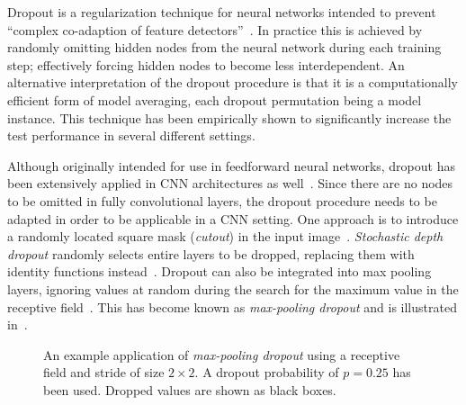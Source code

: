 Dropout is a regularization technique for neural networks intended to prevent \enquote{complex co-adaption of feature detectors}~\cite{dropout-original-paper}.
In practice this is achieved by randomly omitting hidden nodes from the neural network during each training step; effectively forcing hidden nodes to become less interdependent.
An alternative interpretation of the dropout procedure is that it is a computationally efficient form of model averaging, each dropout permutation being a model instance.
This technique has been empirically shown to significantly increase the test performance in several different settings.

Although originally intended for use in feedforward neural networks, dropout has been extensively applied in CNN architectures as well~\cite{dropout-cnn}.
Since there are no nodes to be omitted in fully convolutional layers, the dropout procedure needs to be adapted in order to be applicable in a CNN setting.
One approach is to introduce a randomly located square mask (\textit{cutout}) in the input image~\cite{dropout-cutout}.
\textit{Stochastic depth dropout} randomly selects entire layers to be dropped, replacing them with identity functions instead~\cite{dropout-stochastic-depth}.
Dropout can also be integrated into max pooling layers, ignoring values at random during the search for the maximum value in the receptive field~\cite{max-pooling-dropout}.
This has become known as \textit{max-pooling dropout} and is illustrated in~.

\begin{figure}[htb]
  
  \caption{%
    An example application of \textit{max-pooling dropout} using a receptive field and stride of size $2 \times 2$.
    A dropout probability of $p = 0.25$ has been used.
    Dropped values are shown as black boxes.
  }%
  \label{fig:max-pooling-dropout}
\end{figure}
